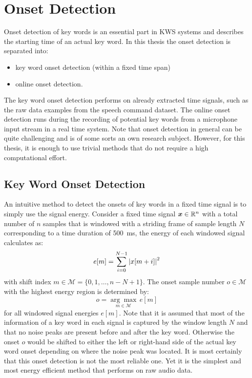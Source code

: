 
\section{Onset Detection}\label{sec:signal_onset}
Onset detection of key words is an essential part in KWS systems and describes the starting time of an actual key word.
In this thesis the onset detection is separated into:
\begin{itemize}
  \item key word onset detection (within a fixed time span)
  \item online onset detection.
\end{itemize}
The key word onset detection performs on already extracted time signals, such as the raw data examples from the speech command dataset.
The online onset detection runs during the recording of potential key words from a microphone input stream in a real time system.
Note that onset detection in general can be quite challenging and is of some sorts an own research subject.
However, for this thesis, it is enough to use trivial methods that do not require a high computational effort.



\subsection{Key Word Onset Detection}\label{sec:signal_onset_kw}
An intuitive method to detect the onsets of key words in a fixed time signal is to simply use the signal energy.
Consider a fixed time signal $\bm{x} \in \mathbb{R}^n$ with a total number of $n$ samples that is windowed with a striding frame of sample length $N$ corresponding to a time duration of \SI{500}{\milli\second}, the energy of each windowed signal calculates as:
\begin{equation}\label{eq:e_win}
  e[m] = \sum_{i=0}^{N-1} \abs{x[m + i]}^2
\end{equation}
with shift index $m \in \mathcal{M} = \{0, 1, \dots, n - N + 1\}$.
The onset sample number $o \in \mathcal{M}$ with the highest energy region is determined by:
\begin{equation}\label{eq:onset}
  o = \underset{m \in \mathcal{M}}{\arg \max} \, e[m]
\end{equation}
for all windowed signal energies $e[m]$.
Note that it is assumed that most of the information of a key word in each signal is captured by the window length $N$ and that no noise peaks are present before and after the key word. 
Otherwise the onset $o$ would be shifted to either the left or right-hand side of the actual key word onset depending on where the noise peak was located.
It is most certainly that this onset detection is not the most reliable one. 
Yet it is the simplest and most energy efficient method that performs on raw audio data.


